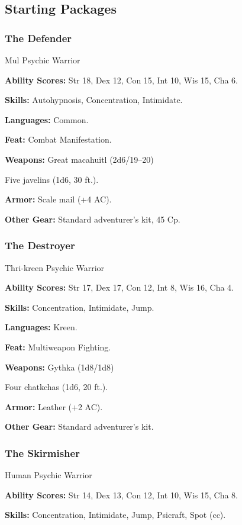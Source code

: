 \subsection{Starting Packages}
\subsubsection{The Defender}

Mul Psychic Warrior

\textbf{Ability Scores:} Str 18, Dex 12, Con 15, Int 10, Wis 15, Cha 6.

\textbf{Skills:} Autohypnosis, Concentration, Intimidate.

\textbf{Languages:} Common.

\textbf{Feat:} Combat Manifestation.

\textbf{Weapons:} Great macahuitl (2d6/19–20)

Five javelins (1d6, 30 ft.).

\textbf{Armor:} Scale mail (+4 AC).

\textbf{Other Gear:} Standard adventurer's kit, 45 Cp.

\subsubsection{The Destroyer}

Thri-kreen Psychic Warrior

\textbf{Ability Scores:} Str 17, Dex 17, Con 12, Int 8, Wis 16, Cha 4.

\textbf{Skills:} Concentration, Intimidate, Jump.

\textbf{Languages:} Kreen.

\textbf{Feat:} Multiweapon Fighting.

\textbf{Weapons:} Gythka (1d8/1d8)

Four chatkchas (1d6, 20 ft.).

\textbf{Armor:} Leather (+2 AC).

\textbf{Other Gear:} Standard adventurer's kit.

\subsubsection{The Skirmisher}

Human Psychic Warrior

\textbf{Ability Scores:} Str 14, Dex 13, Con 12, Int 10, Wis 15, Cha 8.

\textbf{Skills:} Concentration, Intimidate, Jump, Psicraft, Spot (cc).


